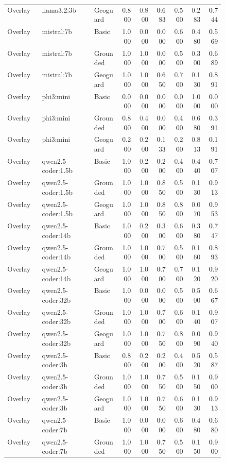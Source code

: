 \begin{longtable}{p{0.16\linewidth}p{0.24\linewidth}p{0.12\linewidth}rrrrrr}
Overlay & llama3.2:3b & Geoguard & 0.800 & 0.800 & 0.683 & 0.500 & 0.283 & 0.744 \\
Overlay & mistral:7b & Basic & 1.000 & 0.000 & 0.000 & 0.600 & 0.480 & 0.569 \\
Overlay & mistral:7b & Grounded & 1.000 & 1.000 & 0.000 & 0.500 & 0.300 & 0.689 \\
Overlay & mistral:7b & Geoguard & 1.000 & 1.000 & 0.650 & 0.700 & 0.130 & 0.891 \\
Overlay & phi3:mini & Basic & 0.000 & 0.000 & 0.000 & 0.000 & 1.000 & 0.000 \\
Overlay & phi3:mini & Grounded & 0.800 & 0.400 & 0.000 & 0.400 & 0.680 & 0.391 \\
Overlay & phi3:mini & Geoguard & 0.200 & 0.200 & 0.133 & 0.200 & 0.813 & 0.191 \\
Overlay & qwen2.5-coder:1.5b & Basic & 1.000 & 0.200 & 0.200 & 0.400 & 0.440 & 0.707 \\
Overlay & qwen2.5-coder:1.5b & Grounded & 1.000 & 1.000 & 0.850 & 0.500 & 0.130 & 0.913 \\
Overlay & qwen2.5-coder:1.5b & Geoguard & 1.000 & 1.000 & 0.850 & 0.800 & 0.070 & 0.953 \\
Overlay & qwen2.5-coder:14b & Basic & 1.000 & 0.200 & 0.300 & 0.600 & 0.380 & 0.747 \\
Overlay & qwen2.5-coder:14b & Grounded & 1.000 & 1.000 & 0.700 & 0.500 & 0.160 & 0.893 \\
Overlay & qwen2.5-coder:14b & Geoguard & 1.000 & 1.000 & 0.700 & 0.700 & 0.120 & 0.920 \\
Overlay & qwen2.5-coder:32b & Basic & 1.000 & 0.000 & 0.000 & 0.500 & 0.500 & 0.667 \\
Overlay & qwen2.5-coder:32b & Grounded & 1.000 & 1.000 & 0.700 & 0.600 & 0.140 & 0.907 \\
Overlay & qwen2.5-coder:32b & Geoguard & 1.000 & 1.000 & 0.750 & 0.800 & 0.090 & 0.940 \\
Overlay & qwen2.5-coder:3b & Basic & 0.800 & 0.200 & 0.200 & 0.400 & 0.520 & 0.587 \\
Overlay & qwen2.5-coder:3b & Grounded & 1.000 & 1.000 & 0.750 & 0.500 & 0.150 & 0.900 \\
Overlay & qwen2.5-coder:3b & Geoguard & 1.000 & 1.000 & 0.750 & 0.600 & 0.130 & 0.913 \\
Overlay & qwen2.5-coder:7b & Basic & 1.000 & 0.000 & 0.000 & 0.600 & 0.480 & 0.680 \\
Overlay & qwen2.5-coder:7b & Grounded & 1.000 & 1.000 & 0.750 & 0.500 & 0.150 & 0.900 \\

\end{longtable}
